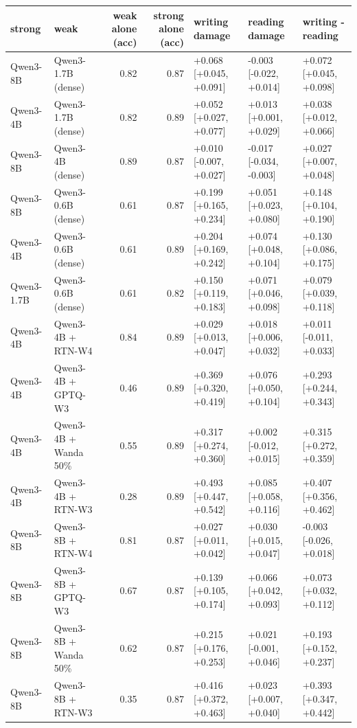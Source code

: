 \begin{tabular}{llrrlll}
\toprule
strong & weak & weak alone (acc) & strong alone (acc) & writing damage & reading damage & writing - reading \\
\midrule
Qwen3-8B & Qwen3-1.7B (dense) & 0.82 & 0.87 & +0.068 [+0.045, +0.091] & -0.003 [-0.022, +0.014] & +0.072 [+0.045, +0.098] \\
Qwen3-4B & Qwen3-1.7B (dense) & 0.82 & 0.89 & +0.052 [+0.027, +0.077] & +0.013 [+0.001, +0.029] & +0.038 [+0.012, +0.066] \\
Qwen3-8B & Qwen3-4B (dense) & 0.89 & 0.87 & +0.010 [-0.007, +0.027] & -0.017 [-0.034, -0.003] & +0.027 [+0.007, +0.048] \\
Qwen3-8B & Qwen3-0.6B (dense) & 0.61 & 0.87 & +0.199 [+0.165, +0.234] & +0.051 [+0.023, +0.080] & +0.148 [+0.104, +0.190] \\
Qwen3-4B & Qwen3-0.6B (dense) & 0.61 & 0.89 & +0.204 [+0.169, +0.242] & +0.074 [+0.048, +0.104] & +0.130 [+0.086, +0.175] \\
Qwen3-1.7B & Qwen3-0.6B (dense) & 0.61 & 0.82 & +0.150 [+0.119, +0.183] & +0.071 [+0.046, +0.098] & +0.079 [+0.039, +0.118] \\
Qwen3-4B & Qwen3-4B + RTN-W4 & 0.84 & 0.89 & +0.029 [+0.013, +0.047] & +0.018 [+0.006, +0.032] & +0.011 [-0.011, +0.033] \\
Qwen3-4B & Qwen3-4B + GPTQ-W3 & 0.46 & 0.89 & +0.369 [+0.320, +0.419] & +0.076 [+0.050, +0.104] & +0.293 [+0.244, +0.343] \\
Qwen3-4B & Qwen3-4B + Wanda 50\% & 0.55 & 0.89 & +0.317 [+0.274, +0.360] & +0.002 [-0.012, +0.015] & +0.315 [+0.272, +0.359] \\
Qwen3-4B & Qwen3-4B + RTN-W3 & 0.28 & 0.89 & +0.493 [+0.447, +0.542] & +0.085 [+0.058, +0.116] & +0.407 [+0.356, +0.462] \\
Qwen3-8B & Qwen3-8B + RTN-W4 & 0.81 & 0.87 & +0.027 [+0.011, +0.042] & +0.030 [+0.015, +0.047] & -0.003 [-0.026, +0.018] \\
Qwen3-8B & Qwen3-8B + GPTQ-W3 & 0.67 & 0.87 & +0.139 [+0.105, +0.174] & +0.066 [+0.042, +0.093] & +0.073 [+0.032, +0.112] \\
Qwen3-8B & Qwen3-8B + Wanda 50\% & 0.62 & 0.87 & +0.215 [+0.176, +0.253] & +0.021 [-0.001, +0.046] & +0.193 [+0.152, +0.237] \\
Qwen3-8B & Qwen3-8B + RTN-W3 & 0.35 & 0.87 & +0.416 [+0.372, +0.463] & +0.023 [+0.007, +0.040] & +0.393 [+0.347, +0.442] \\
\bottomrule
\end{tabular}
